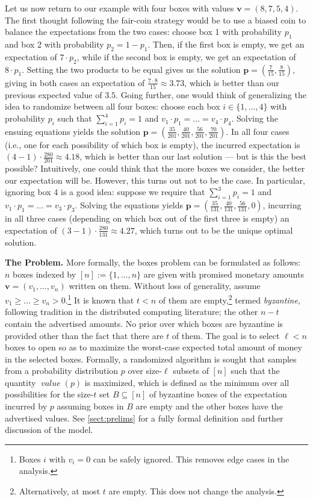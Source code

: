 \documentclass[sigconf,nonacm]{aamas}
\DeclareMathOperator{\valueText}{\textit{value}}
\newcommand{\val}[1]{\valueText({#1})}
\begin{document}
Let us now return to our example with four boxes with values $\mathbf{v} = (8, 7, 5, 4)$. The first thought following the fair-coin strategy would be to use a biased coin to balance the expectations from the two cases: choose box 1 with probability $p_1$ and box 2 with probability $p_2 = 1 - p_1$. Then, if the first box is empty, we get an expectation of $7 \cdot p_2$, while if the second box is empty, we get an expectation of $8 \cdot p_1$. Setting the two products to be equal gives us the solution $\mathbf{p} = (\frac{7}{15}, \frac{8}{15})$, giving in both cases an expectation of $\frac{7 \cdot 8}{15} \approx 3.73$, which is better than our previous expected value of $3.5$. Going further, one would think of generalizing the idea to randomize between all four boxes: choose each box $i \in \{1, \dots, 4\}$ with probability $p_i$ such that $\sum_{i = 1}^4 p_i = 1$ and $v_1 \cdot p_1 = \dots = v_4 \cdot p_4$. Solving the ensuing equations yields the solution $\mathbf{p} = (\frac{35}{201}, \frac{40}{201}, \frac{56}{201}, \frac{70}{201})$. In all four cases (i.e., one for each possibility of which box is empty), the incurred expectation is $(4 - 1) \cdot \frac{280}{201} \approx 4.18$, which is better than our last solution --- but is this the best possible? Intuitively, one could think that the more boxes we consider, the better our expectation will be. 
However, this turns out not to be the case. In particular, ignoring box 4 is a good idea: suppose we require that $\sum_{i = 1}^3 p_i = 1$ and $v_1 \cdot p_1 = \dots = v_3 \cdot p_3$. Solving the equations yields $\mathbf{p} = (\frac{35}{131}, \frac{40}{131}, \frac{56}{131}, 0)$, incurring in all three cases (depending on which box out of the first three is empty) an expectation of $(3 - 1) \cdot \frac{280}{131} \approx 4.27$, which turns out to be the unique optimal solution.

\textbf{The Problem.} More formally, the boxes problem can be formulated as follows: $n$ boxes indexed by $[n] := \{1, \dots, n\}$ are given with promised monetary amounts $\mathbf{v} = (v_1, \dots, v_n)$ written on them. Without loss of generality, assume $v_1 \geq \dots \geq v_n > 0$.\footnote{Boxes $i$ with $v_i = 0$ can be safely ignored. This removes edge cases in the analysis.} It is known that $t < n$ of them are empty,\footnote{Alternatively, at most $t$ are empty. This does not change the analysis.} termed \emph{byzantine}, following tradition in the distributed computing literature; the other $n-t$ contain the advertised amounts. No prior over which boxes are byzantine is provided other than the fact that there are $t$ of them. The goal is to select $\ell < n$ boxes to open so as to maximize the worst-case expected total amount of money in the selected boxes. Formally, a randomized algorithm is sought that samples from a probability distribution $p$ over size-$\ell$ subsets of $[n]$ such that the quantity $\val{p}$ is maximized, which is defined as the minimum over all possibilities for the size-$t$ set $B \subseteq [n]$ of byzantine boxes of the expectation incurred by $p$ assuming boxes in $B$ are empty and the other boxes have the advertised values. See \cref{sect:prelims} for a fully formal definition and further discussion of the model.
\end{document}
